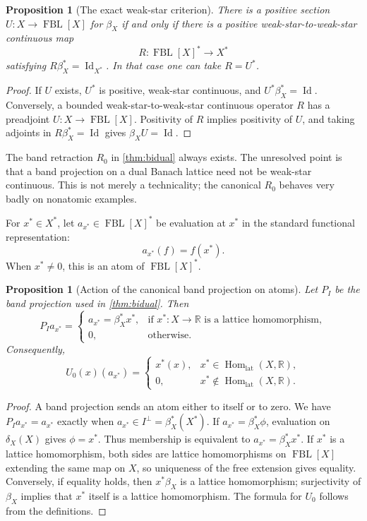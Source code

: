 \documentclass[11pt]{article}
\newtheorem{proposition}[theorem]{Proposition}
\newcommand{\FBL}{\operatorname{FBL}}
\newcommand{\Id}{\operatorname{Id}}
\newcommand{\Homlat}{\operatorname{Hom}_{\mathrm{lat}}}
\newcommand{\R}{\mathbb{R}}
\begin{document}
\begin{proposition}[The exact weak-star criterion]\label{prop:wstar}
There is a positive section $U:X\to\FBL[X]$ for $\beta_X$ if and only if there
is a positive weak-star-to-weak-star continuous map
\[
 R:\FBL[X]^*\longrightarrow X^*
\]
satisfying $R\beta_X^*=\Id_{X^*}$.  In that case one can take $R=U^*$.
\end{proposition}

\begin{proof}
If $U$ exists, $U^*$ is positive, weak-star continuous, and
$U^*\beta_X^*=\Id$.  Conversely, a bounded weak-star-to-weak-star continuous
operator $R$ has a preadjoint $U:X\to\FBL[X]$.  Positivity of $R$ implies
positivity of $U$, and taking adjoints in $R\beta_X^*=\Id$ gives
$\beta_XU=\Id$.
\end{proof}

The band retraction $R_0$ in \cref{thm:bidual} always exists.  The unresolved
point is that a band projection on a dual Banach lattice need not be weak-star
continuous.  This is not merely a technicality; the canonical $R_0$ behaves
very badly on nonatomic examples.

For $x^*\in X^*$, let $a_{x^*}\in\FBL[X]^*$ be evaluation at $x^*$ in the
standard functional representation:
\[
 a_{x^*}(f)=f(x^*).
\]
When $x^*\neq0$, this is an atom of $\FBL[X]^*$.

\begin{proposition}[Action of the canonical band projection on atoms]
\label{prop:atoms}
Let $P_I$ be the band projection used in \cref{thm:bidual}.  Then
\[
 P_Ia_{x^*}=
 \begin{cases}
 a_{x^*}=\beta_X^*x^*,&\text{if }x^*:X\to\R\text{ is a lattice homomorphism},\\
 0,&\text{otherwise}.
 \end{cases}
\]
Consequently,
\[
 U_0(x)(a_{x^*})=
 \begin{cases}
 x^*(x),&x^*\in\Homlat(X,\R),\\
 0,&x^*\notin\Homlat(X,\R).
 \end{cases}
\]
\end{proposition}

\begin{proof}
A band projection sends an atom either to itself or to zero.  We have
$P_Ia_{x^*}=a_{x^*}$ exactly when $a_{x^*}\in I^\perp=\beta_X^*(X^*)$.
If $a_{x^*}=\beta_X^*\phi$, evaluation on $\delta_X(X)$ gives $\phi=x^*$.
Thus membership is equivalent to
$a_{x^*}=\beta_X^*x^*$.  If $x^*$ is a lattice homomorphism, both sides are
lattice homomorphisms on $\FBL[X]$ extending the same map on $X$, so uniqueness
of the free extension gives equality.  Conversely, if equality holds, then
$x^*\beta_X$ is a lattice homomorphism; surjectivity of $\beta_X$ implies that
$x^*$ itself is a lattice homomorphism.  The formula for $U_0$ follows from
the definitions.
\end{proof}
\end{document}
